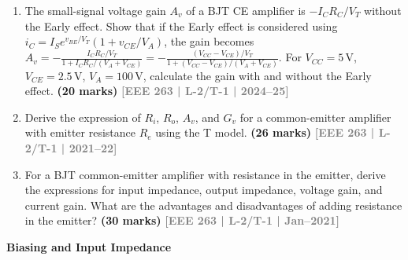 \documentclass[12pt,a4paper]{article}
\newcommand{\yr}[1]{\hfill\textcolor{gray}{\small\textbf{[#1]}}}
\newcommand{\mk}[1]{\textcolor{orange!70!black}{\small\textbf{(#1 marks)}}}
\newcommand{\subtopic}[2]{%
  \vspace{10pt}
  \noindent\begin{tcolorbox}[colback=#1!8,colframe=#1,boxrule=0.6pt,arc=4pt,
    left=6pt,right=6pt,top=4pt,bottom=4pt]
    \small\bfseries\textcolor{#1}{#2}
  \end{tcolorbox}
  \vspace{2pt}
}
\begin{document}
\begin{enumerate}
\item The small-signal voltage gain $A_v$ of a BJT CE amplifier is $-I_C R_C / V_T$ without the Early effect. Show that if the Early effect is considered using $i_C = I_S e^{v_{BE}/V_T}(1 + v_{CE}/V_A)$, the gain becomes $A_v = -\frac{I_C R_C / V_T}{1 + I_C R_C/(V_A + V_{CE})} = -\frac{(V_{CC}-V_{CE})/V_T}{1 + (V_{CC}-V_{CE})/(V_A+V_{CE})}$. For $V_{CC}=5\,\text{V}$, $V_{CE}=2.5\,\text{V}$, $V_A=100\,\text{V}$, calculate the gain with and without the Early effect.
\mk{20} \yr{EEE 263 | L-2/T-1 | 2024--25}

\item Derive the expression of $R_i$, $R_o$, $A_v$, and $G_v$ for a common-emitter amplifier with emitter resistance $R_e$ using the T model.
\mk{26} \yr{EEE 263 | L-2/T-1 | 2021--22}

\item For a BJT common-emitter amplifier with resistance in the emitter, derive the expressions for input impedance, output impedance, voltage gain, and current gain. What are the advantages and disadvantages of adding resistance in the emitter?
\mk{30} \yr{EEE 263 | L-2/T-1 | Jan--2021}

\end{enumerate}

\subtopic{cC}{Biasing and Input Impedance}
\label{sub:s5-biasimpedance}
\end{document}
